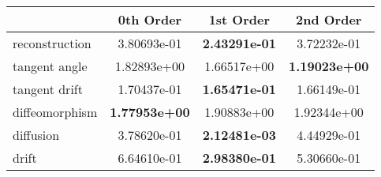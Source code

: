 \begin{tabular}{lccc}
\toprule
 & 0th Order & 1st Order & 2nd Order \\
\midrule
reconstruction & 3.80693e-01 & \textbf{2.43291e-01} & 3.72232e-01 \\
tangent angle & 1.82893e+00 & 1.66517e+00 & \textbf{1.19023e+00} \\
tangent drift & 1.70437e-01 & \textbf{1.65471e-01} & 1.66149e-01 \\
diffeomorphism & \textbf{1.77953e+00} & 1.90883e+00 & 1.92344e+00 \\
diffusion & 3.78620e-01 & \textbf{2.12481e-03} & 4.44929e-01 \\
drift & 6.64610e-01 & \textbf{2.98380e-01} & 5.30660e-01 \\
\bottomrule
\end{tabular}
